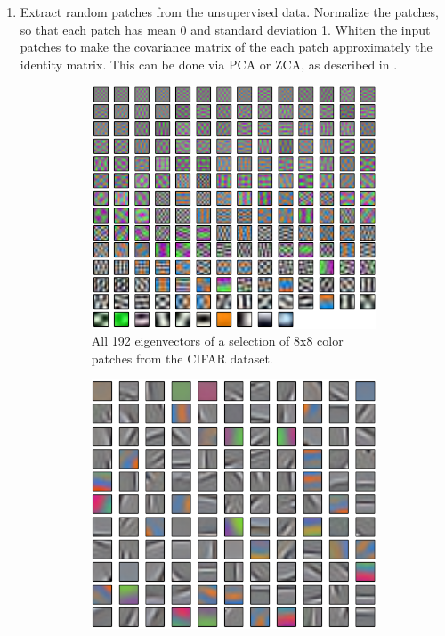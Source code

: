 \documentclass{article} %
\begin{document}
\begin{enumerate}
  \item Extract random patches from the unsupervised data. Normalize the patches, so that each patch has mean 0 and 		standard deviation 1. Whiten the input patches to make the covariance matrix of the each patch approximately the identity matrix. This can be done via PCA or ZCA, as described in \cite{kriz}. 
  
	\label{headings}

\begin{figure}
  \centering
  \begin{subfigure}[h]{0.45\columnwidth}
    \includegraphics[width=\columnwidth]{./images/eigs192.png}
    \caption{All 192 eigenvectors of a selection of 8x8 color patches from the CIFAR dataset.}
    \label{figEigenvectors}
  \end{subfigure}
  \hspace{0.04\columnwidth}
  \centering
  \begin{subfigure}[h]{0.45\columnwidth}
    \includegraphics[width=\columnwidth]{./images/patches100.png}

\end{subfigure}
\end{figure}
\end{enumerate}
\end{document}
